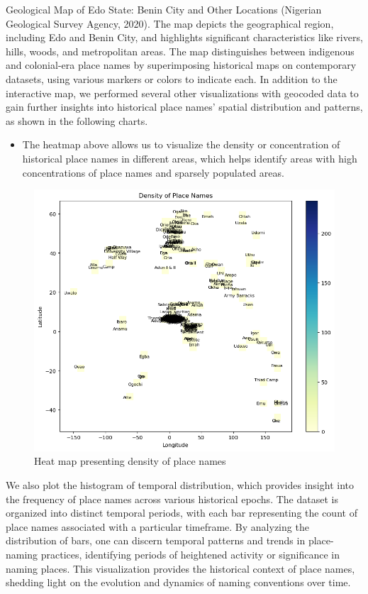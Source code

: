 Geological Map of Edo State: Benin City and Other Locations (Nigerian Geological Survey Agency, 2020). The map depicts the geographical region, including Edo and Benin City, and highlights significant characteristics like rivers, hills, woods, and metropolitan areas. The map distinguishes between indigenous and colonial-era place names by superimposing historical maps on contemporary datasets, using various markers or colors to indicate each.
\newpage
In addition to the interactive map, we performed several other visualizations with geocoded data to gain further insights into historical place names' spatial distribution and patterns, as shown in the following charts.
\begin{itemize}
    \item The heatmap above allows us to visualize the density or concentration of historical place names in different areas, which helps identify areas with high concentrations of place names and sparsely populated areas.
\end{itemize}

\begin{figure}[h!]
    \centering
    \includegraphics[width=1\linewidth]{heatmap1.png}
    \caption{Heat map presenting density of place names}
    \label{fig:heatmap}
\end{figure}
\newpage
We also plot the histogram of temporal distribution, which provides insight into the frequency of place names across various historical epochs. The dataset is organized into distinct temporal periods, with each bar representing the count of place names associated with a particular timeframe. By analyzing the distribution of bars, one can discern temporal patterns and trends in place-naming practices, identifying periods of heightened activity or significance in naming places. This visualization provides the historical context of place names, shedding light on the evolution and dynamics of naming conventions over time.


